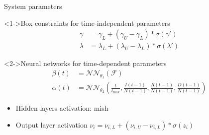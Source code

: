 \begin{frame}{System parameters}
    \begin{block}<1->{Box constraints for time-independent parameters}
        \begin{equation*}
            \begin{aligned}
                \gamma &= \gamma_L + (\gamma_U - \gamma_L) * \sigma (\gamma')\\
                \lambda &= \lambda_L + (\lambda_U - \lambda_L) * \sigma (\lambda')
            \end{aligned}
        \end{equation*}
    \end{block}

    \begin{block}<2->{Neural networks for time-dependent parameters}
        \begin{equation*}
            \begin{aligned}
                \beta(t) &= \mathcal{NN}_{\theta_1}(\mathcal{F}) \\
                \alpha(t) &= \mathcal{NN}_{\theta_2} (\frac{t}{t_\text{max}}, \frac{I(t-1)}{N(t-1)}, \frac{R(t-1)}{N(t-1)}, \frac{D(t-1)}{N(t-1)})
            \end{aligned}
        \end{equation*}
        \begin{itemize}
            \item Hidden layers activation: mish \cite{misraMishSelfRegularized2020}
            \item Output layer activation $\nu_i = \nu_{i,L} + (\nu_{i,U} - \nu_{i,L}) * \sigma (z_i)$
        \end{itemize}
    \end{block}
\end{frame}

